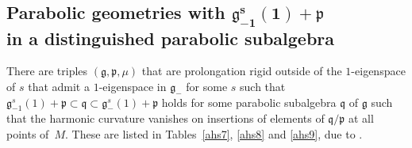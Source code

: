 \documentclass[pdftex]{sigma}
\newcommand{\fg}{\mathfrak g}
\newcommand{\fv}{\mathfrak q}
\newcommand{\fp}{\mathfrak p}
\numberwithin{equation}{section}
\begin{document}
\subsection[Parabolic geometries with $\fg_{-1}^s(1)+\fp$ in a distinguished parabolic subalgebra]{Parabolic geometries with $\boldsymbol{\fg_{-1}^s(1)+\fp}$ \\ in a distinguished parabolic subalgebra}\label{sec5.4}

There are triples $(\fg,\fp,\mu)$ that are prolongation rigid outside of the $1$-eigenspace of $s$ that admit a $1$-eigenspace in $\fg_-$ for some $s$ such that $\fg_{-1}^s(1)+\fp\subset \fv\subset \fg_{-}^s(1)+\fp$ holds for some parabolic subalgebra $\fv$ of $\fg$ such that the harmonic curvature vanishes on insertions of elements of $\fv/\fp$ at all points of~$M$. These are listed in Tables~\ref{ahs7}, \ref{ahs8} and \ref{ahs9}, due to \cite[Propositions~6.2 and~A.2]{GZ3}.
\end{document}
